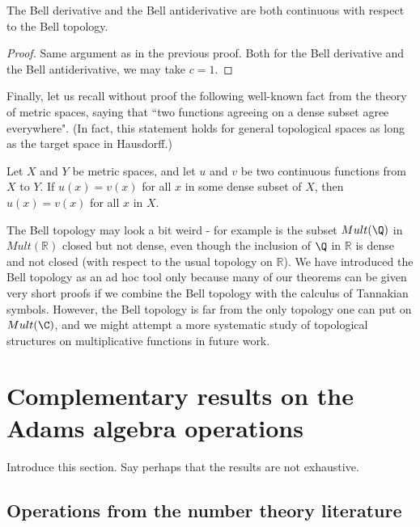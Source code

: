 \documentclass[a4paper]{article}
\begin{document}
\begin{theorem} \label{BellDerivativeContinuity}
The Bell derivative and the Bell antiderivative are both continuous with respect to the Bell topology.
\end{theorem}
\begin{proof}
Same argument as in the previous proof. Both for the Bell derivative and the Bell antiderivative, we may take $c=1$. 
\end{proof}

Finally, let us recall without proof the following well-known fact from the theory of metric spaces, saying that ``two functions agreeing on a dense subset agree everywhere". (In fact, this statement holds for general topological spaces as long as the target space in Hausdorff.)

\begin{proposition}
Let $X$ and $Y$ be metric spaces, and let $u$ and $v$ be two continuous functions from $X$ to $Y$. If $u(x) = v(x)$ for all $x$ in some dense subset of $X$, then $u(x) = v(x)$ for all $x$ in $X$.  
\end{proposition}

\begin{remark}
The Bell topology may look a bit weird - for example is the subset $Mult(\Q)$ in $Mult(\mathbb{R})$ closed but not dense, even though the inclusion of $\Q$ in $\mathbb{R}$ is dense and not closed (with respect to the usual topology on $\mathbb{R}$). We have introduced the Bell topology as an ad hoc tool only because many of our theorems can be given very short proofs if we combine the Bell topology with the calculus of Tannakian symbols. However, the Bell topology is far from the only topology one can put on $Mult(\C)$, and we might attempt a more systematic study of topological structures on multiplicative functions in future work. 
\end{remark}




\section{Complementary results on the Adams algebra operations}  \label{sec:Complementary}

Introduce this section. Say perhaps that the results are not exhaustive.

\subsection{Operations from the number theory literature}
\end{document}
